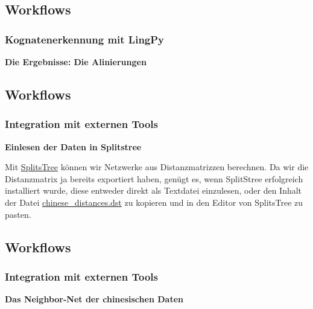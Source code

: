 \subsection{\texorpdfstring{{Workflows}}{Workflows}}

\subsubsection{\texorpdfstring{{Kognatenerkennung mit
LingPy}}{Kognatenerkennung mit LingPy}}

\textbf{Die Ergebnisse: Die Alinierungen}

\subsection{\texorpdfstring{{Workflows}}{Workflows}}

\subsubsection{\texorpdfstring{{Integration mit externen
Tools}}{Integration mit externen Tools}}

\textbf{Einlesen der Daten in Splitstree}

Mit \href{http://splitstree.org}{SplitsTree} können wir Netzwerke aus
Distanzmatrizzen berechnen. Da wir die Distanzmatrix ja bereits
exportiert haben, genügt es, wenn SplitStree erfolgreich installiert
wurde, diese entweder direkt als Textdatei einzulesen, oder den Inhalt
der Datei
\href{ttps://github.com/LinguList/pyjs-seminar/blob/master/website/code/data/chinese_distances.dst}{chinese\_distances.dst}
zu kopieren und in den Editor von SplitsTree zu pasten.

\subsection{\texorpdfstring{{Workflows}}{Workflows}}

\subsubsection{\texorpdfstring{{Integration mit externen
Tools}}{Integration mit externen Tools}}

\textbf{Das Neighbor-Net der chinesischen Daten}

